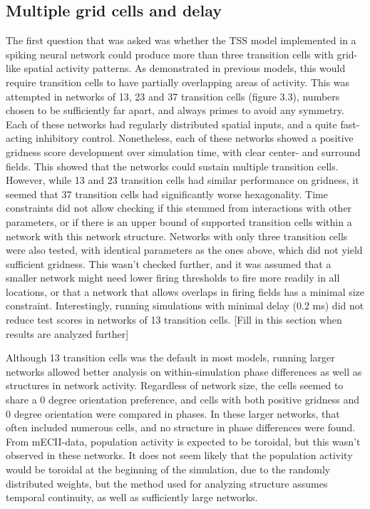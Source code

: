 \documentclass{article}
\begin{document}
    \subsection{Multiple grid cells and delay}
    The first question that was asked was whether the TSS model implemented in a spiking neural network could produce more than three transition cells with grid-like spatial activity patterns. As demonstrated in previous models, this would require transition cells to have partially overlapping areas of activity. This was attempted in networks of 13, 23 and 37 transition cells (figure 3.3), numbers chosen to be sufficiently far apart, and always primes to avoid any symmetry. Each of these networks had regularly distributed spatial inputs, and a quite fast-acting inhibitory control. Nonetheless, each of these networks showed a positive gridness score development over simulation time, with clear center- and surround fields. This showed that the networks could sustain multiple transition cells. However, while 13 and 23 transition cells had similar performance on gridness, it seemed that 37 transition cells had significantly worse hexagonality. Time constraints did not allow checking if this stemmed from interactions with other parameters, or if there is an upper bound of supported transition cells within a network with this network structure.
    Networks with only three transition cells were also tested, with identical parameters as the ones above, which did not yield sufficient gridness. This wasn't checked further, and it was assumed that a smaller network might need lower firing thresholds to fire more readily in all locations, or that a network that allows overlaps in firing fields has a minimal size constraint.
    Interestingly, running simulations with minimal delay (0.2 ms) did not reduce test scores in networks of 13 transition cells. [Fill in this section when results are analyzed further]

    Although 13 transition cells was the default in most models, running larger networks allowed better analysis on within-simulation phase differences as well as structures in network activity. Regardless of network size, the cells seemed to share a 0 degree orientation preference, and cells with both positive gridness and 0 degree orientation were compared in phases. In these larger networks, that often included numerous cells, and no structure in phase differences were found. From mECII-data, population activity is expected to be toroidal, but this wasn't observed in these networks. It does not seem likely that the population activity would be toroidal at the beginning of the simulation, due to the randomly distributed weights, but the method used for analyzing structure assumes temporal continuity, as well as sufficiently large networks.
\end{document}
